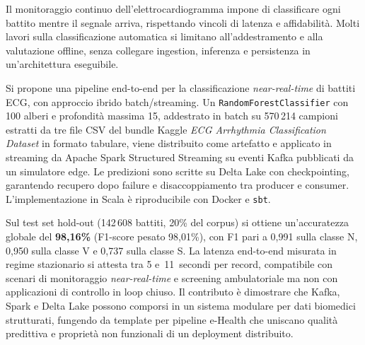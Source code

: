 Il monitoraggio continuo dell'elettrocardiogramma impone di classificare ogni battito mentre il segnale arriva, rispettando vincoli di latenza e affidabilità.
Molti lavori sulla classificazione automatica si limitano all'addestramento e alla valutazione offline, senza collegare ingestion, inferenza e persistenza in un'architettura eseguibile.

Si propone una pipeline end-to-end per la classificazione \emph{near-real-time} di battiti ECG, con approccio ibrido batch/streaming.
Un \texttt{RandomForestClassifier} con 100 alberi e profondità massima 15, addestrato in batch su 570\,214 campioni estratti da tre file CSV del bundle Kaggle \emph{ECG Arrhythmia Classification Dataset} in formato tabulare, viene distribuito come artefatto e applicato in streaming da Apache Spark Structured Streaming su eventi Kafka pubblicati da un simulatore edge.
Le predizioni sono scritte su Delta Lake con checkpointing, garantendo recupero dopo failure e disaccoppiamento tra producer e consumer.
L'implementazione in Scala è riproducibile con Docker e \texttt{sbt}.

Sul test set hold-out (142\,608 battiti, 20\% del corpus) si ottiene un'accuratezza globale del \textbf{98,16\%} (F1-score pesato 98,01\%),
con F1 pari a 0,991 sulla classe N, 0,950 sulla classe V e 0,737 sulla classe S.
La latenza end-to-end misurata in regime stazionario si attesta tra 5 e~11~secondi per record, compatibile con scenari di monitoraggio \emph{near-real-time} e screening ambulatoriale ma non con applicazioni di controllo in loop chiuso.
Il contributo è dimostrare che Kafka, Spark e Delta Lake possono comporsi in un sistema modulare per dati biomedici strutturati, fungendo da template per pipeline e-Health che uniscano qualità predittiva e proprietà non funzionali di un deployment distribuito.
